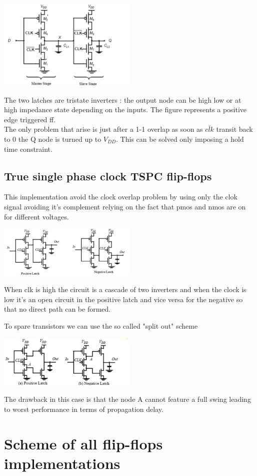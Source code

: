\centering
\includegraphics[width=0.5\textwidth]{C10_16.png}\\
\raggedright

The two latches are tristate inverters : the output node can be high low or at high impedance state depending on the inputs. The figure represents a positive edge triggered ff.\\
The only problem that arise is just after a 1-1 overlap as soon as $\bar{clk}$ transit back to 0 the Q node is turned up to $V_{DD}$. This can be solved only imposing a hold time constraint.\\


\subsection{True single phase clock TSPC flip-flops}
This implementation avoid the clock overlap problem by using only the clok signal avoiding it's complement relying on the fact that pmos and nmos are on for different voltages.

\centering
\includegraphics[width=0.5\textwidth]{C10_17.png}\\
\raggedright

When clk is high the circuit is a cascade of two inverters and when the clock is low it's an open circuit in the positive latch and vice versa for the negative so that no direct path can be formed.\\
\vspace{5mm}


To spare transistors we can use the so called "split out" scheme 

\centering
\includegraphics[width=0.5\textwidth]{C10_18.png}\\
\raggedright

The drawback in this case is that the node A cannot feature a full swing leading to worst performance in terms of propagation delay.\\



\section{Scheme of all flip-flops implementations}


